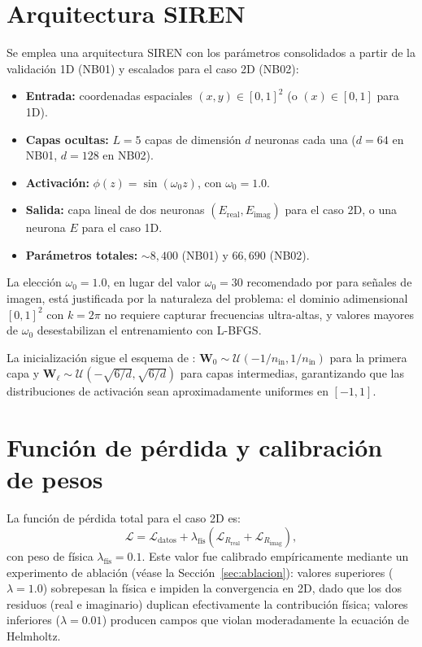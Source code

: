 \section{Arquitectura SIREN}

Se emplea una arquitectura SIREN con los parámetros consolidados a partir de la
validación 1D (NB01) y escalados para el caso 2D (NB02):

\begin{itemize}
    \item \textbf{Entrada:} coordenadas espaciales $(x, y) \in [0,1]^2$ (o
    $(x) \in [0,1]$ para 1D).
    \item \textbf{Capas ocultas:} $L = 5$ capas de dimensión $d$ neuronas cada
    una ($d = 64$ en NB01, $d = 128$ en NB02).
    \item \textbf{Activación:} $\phi(z) = \sin(\omega_0 z)$, con $\omega_0 = 1.0$.
    \item \textbf{Salida:} capa lineal de dos neuronas $(E_\text{real}, E_\text{imag})$
    para el caso 2D, o una neurona $E$ para el caso 1D.
    \item \textbf{Parámetros totales:} ${\sim}8{,}400$ (NB01) y $66{,}690$ (NB02).
\end{itemize}

La elección $\omega_0 = 1.0$, en lugar del valor $\omega_0 = 30$ recomendado
por \textcite{sitzmann2020siren} para señales de imagen, está justificada por la
naturaleza del problema: el dominio adimensional $[0,1]^2$ con $k = 2\pi$ no
requiere capturar frecuencias ultra-altas, y valores mayores de $\omega_0$
desestabilizan el entrenamiento con L-BFGS.

La inicialización sigue el esquema de \textcite{sitzmann2020siren}:
$\mathbf{W}_0 \sim \mathcal{U}(-1/n_\text{in}, 1/n_\text{in})$ para la primera
capa y $\mathbf{W}_\ell \sim \mathcal{U}(-\sqrt{6/d}, \sqrt{6/d})$ para capas
intermedias, garantizando que las distribuciones de activación sean
aproximadamente uniformes en $[-1, 1]$.

\section{Función de pérdida y calibración de pesos}

La función de pérdida total para el caso 2D es:
%
\begin{equation}
    \mathcal{L} = \mathcal{L}_\text{datos}
    + \lambda_\text{fís}\!\left(
    \mathcal{L}_{R_\text{real}} + \mathcal{L}_{R_\text{imag}}
    \right),
    \label{eq:loss_2d}
\end{equation}
%
con peso de física $\lambda_\text{fís} = 0.1$. Este valor fue calibrado
empíricamente mediante un experimento de ablación (véase la
Sección~\ref{sec:ablacion}): valores superiores ($\lambda = 1.0$) sobrepesan la
física e impiden la convergencia en 2D, dado que los dos residuos (real e
imaginario) duplican efectivamente la contribución física; valores inferiores
($\lambda = 0.01$) producen campos que violan moderadamente la ecuación de
Helmholtz.

